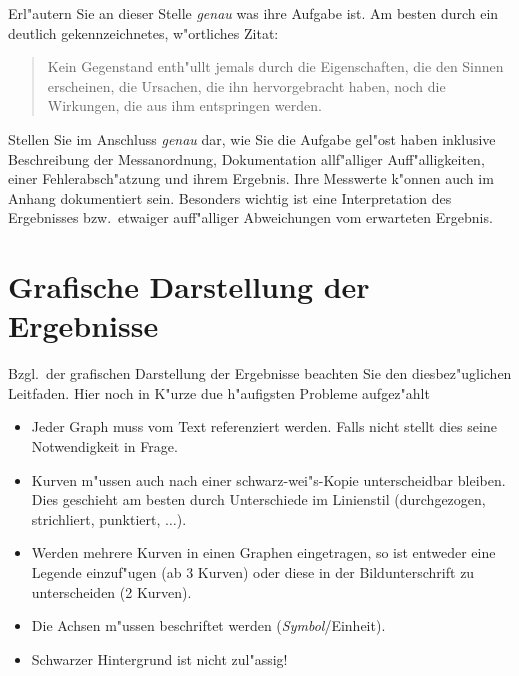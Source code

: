 \documentclass[a4paper,oneside,10pt]{article}%
\begin{document}
Erl"autern Sie an dieser Stelle \emph{genau} was ihre Aufgabe ist. Am besten durch ein deutlich gekennzeichnetes, w"ortliches Zitat: 
\begin{quote}
Kein Gegenstand enth"ullt jemals durch die Eigenschaften, die den Sinnen erscheinen, die Ursachen, die ihn hervorgebracht haben, noch die Wirkungen, die aus ihm entspringen werden.
\end{quote}
Stellen Sie im Anschluss \emph{genau} dar, wie Sie die Aufgabe gel"ost haben inklusive Beschreibung der Messanordnung, Dokumentation allf"alliger Auff"alligkeiten, einer Fehlerabsch"atzung und ihrem Ergebnis. Ihre Messwerte k"onnen auch im Anhang dokumentiert sein. Besonders wichtig ist eine Interpretation des Ergebnisses bzw.~etwaiger auff"alliger Abweichungen vom erwarteten Ergebnis.

\section{Grafische Darstellung der Ergebnisse}

Bzgl.~der grafischen Darstellung der Ergebnisse beachten Sie den diesbez"uglichen Leitfaden. Hier noch in K"urze due h"aufigsten Probleme aufgez"ahlt
\begin{itemize}
\item Jeder Graph muss vom Text referenziert werden. Falls nicht stellt dies seine Notwendigkeit in Frage.
\item Kurven m"ussen auch nach einer schwarz-wei"s-Kopie unterscheidbar bleiben. Dies geschieht am besten durch Unterschiede im Linienstil (durchgezogen, strichliert, punktiert, $\ldots$).
\item Werden mehrere Kurven in einen Graphen eingetragen, so ist entweder eine Legende einzuf"ugen (ab 3 Kurven) oder diese in der Bildunterschrift zu unterscheiden (2 Kurven).
\item Die Achsen m"ussen beschriftet werden (\textit{Symbol}/Einheit).
\item Schwarzer Hintergrund ist nicht zul"assig!
\end{itemize}

	

\end{document}

